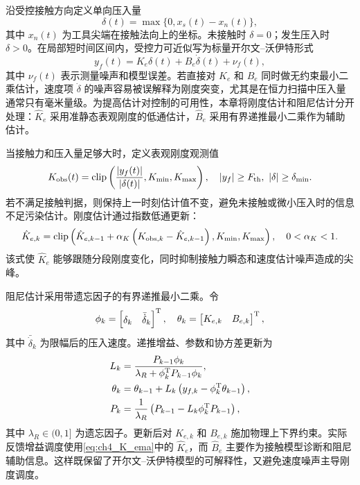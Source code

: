 沿受控接触方向定义单向压入量
\begin{equation}
  \delta(t)=\max\{0,x_s(t)-x_n(t)\},
  \label{eq:ch4_delta_contact}
\end{equation}
其中 $x_n(t)$ 为工具尖端在接触法向上的坐标。未接触时 $\delta=0$；发生压入时 $\delta>0$。在局部短时间区间内，受控力可近似写为标量开尔文--沃伊特形式
\begin{equation}
  y_f(t)=K_e\delta(t)+B_e\dot\delta(t)+\nu_f(t),
  \label{eq:ch4_scalar_kv}
\end{equation}
其中 $\nu_f(t)$ 表示测量噪声和模型误差。若直接对 $K_e$ 和 $B_e$ 同时做无约束最小二乘估计，速度项 $\dot\delta$ 的噪声容易被误解释为刚度突变，尤其是在恒力扫描中压入量通常只有毫米量级。为提高估计对控制的可用性，本章将刚度估计和阻尼估计分开处理：$\hat K_e$ 采用准静态表观刚度的低通估计，$\hat B_e$ 采用有界递推最小二乘作为辅助估计。

当接触力和压入量足够大时，定义表观刚度观测值
\begin{equation}
  K_{\mathrm{obs}}(t)=
  \operatorname{clip}\left(\frac{|y_f(t)|}{|\delta(t)|},K_{\min},K_{\max}\right),
  \quad |y_f|\ge F_{\mathrm{th}},\ |\delta|\ge\delta_{\min}.
  \label{eq:ch4_K_obs}
\end{equation}
若不满足接触判据，则保持上一时刻估计值不变，避免未接触或微小压入时的信息不足污染估计。刚度估计通过指数低通更新：
\begin{equation}
  \hat K_{e,k}=
  \operatorname{clip}\left(\hat K_{e,k-1}+\alpha_K\left(K_{\mathrm{obs},k}-\hat K_{e,k-1}\right),
  K_{\min},K_{\max}\right),
  \quad 0<\alpha_K<1 .
  \label{eq:ch4_K_ema}
\end{equation}
该式使 $\hat K_e$ 能够跟随分段刚度变化，同时抑制接触力瞬态和速度估计噪声造成的尖峰。

阻尼估计采用带遗忘因子的有界递推最小二乘。令
\begin{equation}
  \phi_k=\begin{bmatrix}\delta_k&\bar{\dot\delta}_k\end{bmatrix}^{\mathrm{T}},
  \quad
  \theta_k=\begin{bmatrix}K_{e,k}&B_{e,k}\end{bmatrix}^{\mathrm{T}},
  \label{eq:ch4_rls_phi_theta}
\end{equation}
其中 $\bar{\dot\delta}_k$ 为限幅后的压入速度。递推增益、参数和协方差更新为
\begin{align}
  L_k&=\frac{P_{k-1}\phi_k}{\lambda_R+\phi_k^{\mathrm{T}}P_{k-1}\phi_k},
  \label{eq:ch4_rls_gain}\\
  \theta_k&=\theta_{k-1}+L_k\left(y_{f,k}-\phi_k^{\mathrm{T}}\theta_{k-1}\right),
  \label{eq:ch4_rls_theta}\\
  P_k&=\frac{1}{\lambda_R}\left(P_{k-1}-L_k\phi_k^{\mathrm{T}}P_{k-1}\right),
  \label{eq:ch4_rls_P}
\end{align}
其中 $\lambda_R\in(0,1]$ 为遗忘因子。更新后对 $K_{e,k}$ 和 $B_{e,k}$ 施加物理上下界约束。实际反馈增益调度使用\eqref{eq:ch4_K_ema}中的 $\hat K_e$，而 $\hat B_e$ 主要作为接触模型诊断和阻尼辅助信息。这样既保留了开尔文--沃伊特模型的可解释性，又避免速度噪声主导刚度调度。

